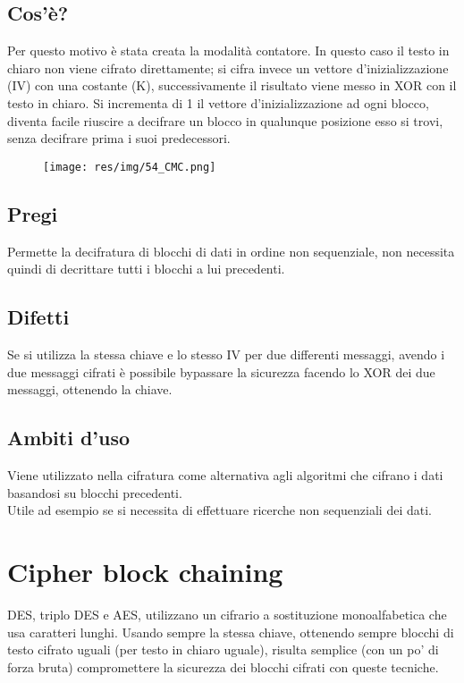 \subsection{Cos'è?}
Per questo motivo è stata creata la modalità contatore. In questo caso il testo in chiaro non viene cifrato direttamente; si cifra invece un vettore d'inizializzazione (IV) con una costante (K), successivamente il risultato viene messo in XOR con il testo in chiaro. Si incrementa di 1 il vettore d'inizializzazione ad ogni blocco, diventa facile riuscire a decifrare un blocco in qualunque posizione esso si trovi, senza decifrare prima i suoi predecessori.

\begin{figure}[H]
\centering
\texttt{[image: res/img/54\_CMC.png]}
\end{figure}

\subsection{Pregi}
Permette la decifratura di blocchi di dati in ordine non sequenziale, non necessita quindi di decrittare tutti i blocchi a lui precedenti.

\subsection{Difetti}
Se si utilizza la stessa chiave e lo stesso IV per due differenti messaggi, avendo i due messaggi cifrati è possibile bypassare la sicurezza facendo lo XOR dei due messaggi, ottenendo la chiave.

\subsection{Ambiti d'uso}
Viene utilizzato nella cifratura come alternativa agli algoritmi che cifrano i dati basandosi su blocchi precedenti.\\
Utile ad esempio se si necessita di effettuare ricerche non sequenziali dei dati.

\section{Cipher block chaining}

DES, triplo DES e AES, utilizzano un cifrario a sostituzione monoalfabetica che usa caratteri lunghi. Usando sempre la stessa chiave, ottenendo sempre blocchi di testo cifrato uguali (per testo in chiaro uguale), risulta semplice (con un po' di forza bruta) compromettere la sicurezza dei blocchi cifrati con queste tecniche.
